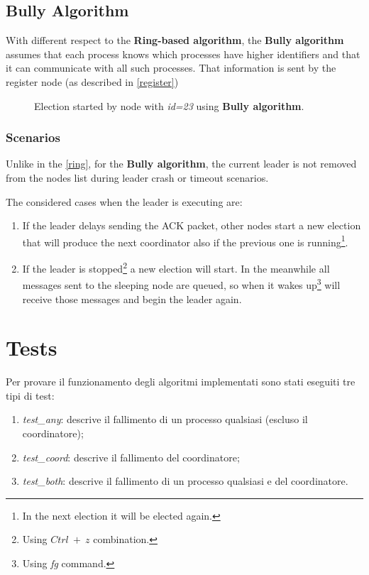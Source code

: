 \documentclass[conference]{IEEEtran}
\begin{document}
\subsection{Bully Algorithm}

With different respect to the \textbf{Ring-based algorithm}, the \textbf{Bully algorithm} assumes that each process knows which processes have higher identifiers and that it can communicate with all such processes. That information is sent by the register node (as described in \ref{register}) 

\begin{figure}[htbp]
  \centering
  
  \caption{Election started by node with \textit{id=23} using \textbf{Bully algorithm}.}
\end{figure}

\subsubsection{Scenarios}

Unlike in the \ref{ring}, for the \textbf{Bully algorithm}, the current leader is not removed from the nodes list during leader crash or timeout scenarios.

The considered cases when the leader is executing are:  

\begin{enumerate}
    \item If the leader delays sending the ACK packet, other nodes start a new election that will produce the next coordinator also if the previous one is running\footnote{In the next election it will be elected again.}.
    \item If the leader is stopped\footnote{Using $Ctrl\ +\ z$ combination.} a new election will start. In the meanwhile all messages sent to the sleeping node are queued, so when it wakes up\footnote{Using \textit{fg} command.} will receive those messages and begin the leader again.
\end{enumerate}

\section{Tests}\label{sec:tests}

Per provare il funzionamento degli algoritmi implementati sono stati eseguiti tre tipi di test:

\begin{enumerate}
    \item \textit{test\_any}: descrive il fallimento di un processo qualsiasi (escluso il coordinatore);
    \item \textit{test\_coord}: descrive il fallimento del coordinatore;
    \item \textit{test\_both}: descrive il fallimento di un processo qualsiasi e del coordinatore.
\end{enumerate}
\end{document}
